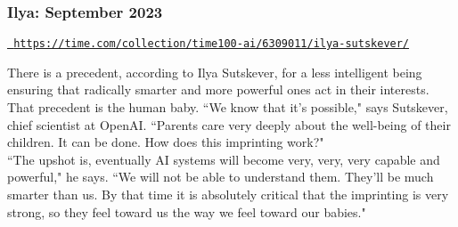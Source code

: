 \documentclass{beamer}
\newenvironment{customquote}
  {\begin{adjustwidth}{2em}{2em}\noindent\textnormal}
  {\end{adjustwidth}}
\newcommand{\msblue}[1]{{\color{myblue} #1}}
\begin{document}
\begin{frame}

  \frametitle{Ilya: September 2023}

\href{https://time.com/collection/time100-ai/6309011/ilya-sutskever/}{\tt\small \msblue{https://time.com/collection/time100-ai/6309011/ilya-sutskever/}}\\[2ex]

\begin{customquote}
There is a precedent, according to Ilya Sutskever, for a less intelligent being ensuring that radically smarter and more powerful ones act in their interests. That precedent is the human baby. ``We know that it’s possible," says Sutskever, chief scientist at OpenAI. ``Parents care very deeply about the well-being of their children. It can be done. How does this imprinting work?"\\[2ex]

``The upshot is, eventually AI systems will become very, very, very capable and powerful," he says. ``We will not be able to understand them. They’ll be much smarter than us. By that time it is absolutely critical that the imprinting is very strong, so they feel toward us the way we feel toward our babies."
\end{customquote}

\end{frame}
\end{document}

